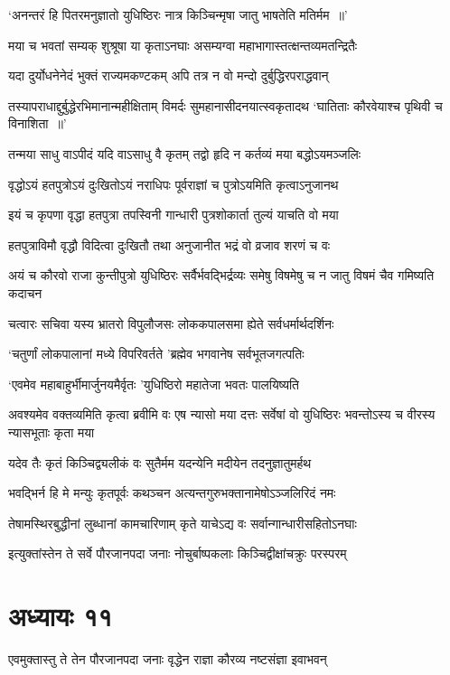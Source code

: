 \twolineshloka
{`अनन्तरं हि पितरमनुज्ञातो युधिष्ठिरः}
{नात्र किञ्चिन्मृषा जातु भाषतेति मतिर्मम ॥'}


\twolineshloka
{मया च भवतां सम्यक् शुश्रूषा या कृताऽनघाः}
{असम्यग्वा महाभागास्तत्क्षन्तव्यमतन्द्रितैः}


\twolineshloka
{यदा दुर्योधनेनेदं भुक्तं राज्यमकण्टकम्}
{अपि तत्र न वो मन्दो दुर्बुद्धिरपराद्धवान्}


\threelineshloka
{तस्यापराधाद्दुर्बुद्धेरभिमानान्महीक्षिताम्}
{विमर्दः सुमहानासीदनयात्स्वकृतादथ}
{`घातिताः कौरवेयाश्च पृथिवी च विनाशिता ॥'}


\twolineshloka
{तन्मया साधु वाऽपीदं यदि वाऽसाधु वै कृतम्}
{तद्वो हृदि न कर्तव्यं मया बद्धोऽयमञ्जलिः}


\twolineshloka
{वृद्धोऽयं हतपुत्रोऽयं दुःखितोऽयं नराधिपः}
{पूर्वराज्ञां च पुत्रोऽयमिति कृत्वाऽनुजानथ}


\twolineshloka
{इयं च कृपणा वृद्धा हतपुत्रा तपस्विनी}
{गान्धारी पुत्रशोकार्ता तुल्यं याचति वो मया}


\twolineshloka
{हतपुत्राविमौ वृद्धौ विदित्वा दुःखितौ तथा}
{अनुजानीत भद्रं वो व्रजाव शरणं च वः}


\threelineshloka
{अयं च कौरवो राजा कुन्तीपुत्रो युधिष्ठिरः}
{सर्वैर्भवद्भिर्द्रव्यः समेषु विषमेषु च}
{न जातु विषमं चैव गमिष्यति कदाचन}


\twolineshloka
{चत्वारः सचिवा यस्य भ्रातरो विपुलौजसः}
{लोककपालसमा ह्येते सर्वधर्मार्थदर्शिनः}


\twolineshloka
{`चतुर्णां लोकपालानां मध्ये विपरिवर्तते}
{'ब्रह्मेव भगवानेष सर्वभूतजगत्पतिः}


\twolineshloka
{`एवमेव महाबाहुर्भीमार्जुनयमैर्वृतः}
{'युधिष्ठिरो महातेजा भवतः पालयिष्यति}


\threelineshloka
{अवश्यमेव वक्तव्यमिति कृत्वा ब्रवीमि वः}
{एष न्यासो मया दत्तः सर्वेषां वो युधिष्ठिरः}
{भवन्तोऽस्य च वीरस्य न्यासभूताः कृता मया}


\twolineshloka
{यदेव तैः कृतं किञ्चिद्व्यलीकं वः सुतैर्मम}
{यदन्येनि मदीयेन तदनुज्ञातुमर्हथ}


\twolineshloka
{भवद्भिर्न हि मे मन्युः कृतपूर्वः कथञ्चन}
{अत्यन्तगुरुभक्तानामेषोऽञ्जलिरिदं नमः}


\twolineshloka
{तेषामस्थिरबुद्धीनां लुब्धानां कामचारिणाम्}
{कृते याचेऽद्य वः सर्वान्गान्धारीसहितोऽनघाः}


\twolineshloka
{इत्युक्तांस्तेन ते सर्वे पौरजानपदा जनाः}
{नोचुर्बाष्पकलाः किञ्चिद्वीक्षांचक्रुः परस्परम्}


\chapter{अध्यायः ११}
\twolineshloka
{एवमुक्तास्तु ते तेन पौरजानपदा जनाः}
{वृद्धेन राज्ञा कौरव्य नष्टसंज्ञा इवाभवन्}


